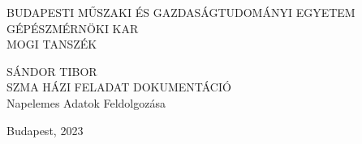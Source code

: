 \begin{titlepage}
  \begin{center}
    {
      \large
      BUDAPESTI MŰSZAKI ÉS GAZDASÁGTUDOMÁNYI EGYETEM \\[2mm]
      GÉPÉSZMÉRNÖKI KAR \\[2mm]
      MOGI TANSZÉK
    }

    \vspace{50mm}

    {
      \LARGE
      \uppercase{Sándor Tibor} \\[2mm]
      \uppercase{SZMA Házi Feladat dokumentáció} \\[4mm]
      Napelemes Adatok Feldolgozása
    }


    \vfill

    {
      \large
      Budapest, 2023
    }
  \end{center}
\end{titlepage}
